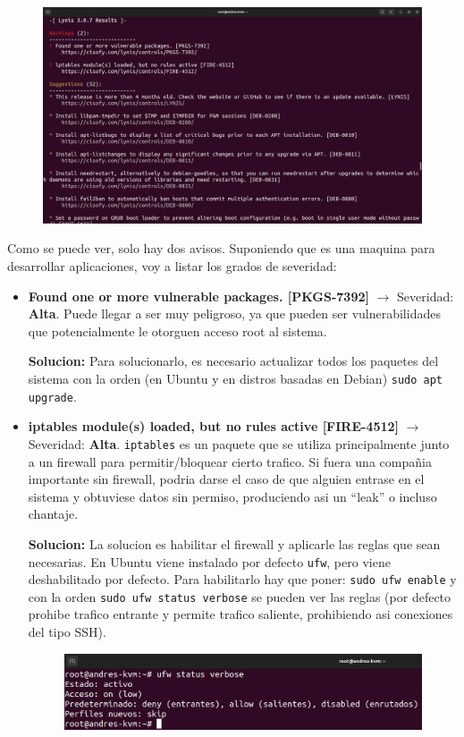 \documentclass{article}
\begin{document}
\begin{figure}[H]
    \includegraphics[width=\textwidth]{imagenes/lyniswarnings1.png}
\end{figure}

Como se puede ver, solo hay dos avisos. Suponiendo que es una maquina para desarrollar aplicaciones, voy a listar los grados de severidad:

\begin{itemize}
    \item \textbf{Found one or more vulnerable packages. [PKGS-7392]} $\rightarrow$ Severidad: \textbf{Alta}. Puede llegar a ser muy peligroso, ya que pueden ser vulnerabilidades que potencialmente le otorguen acceso root al sistema. 
    
    \textbf{Solucion: }Para solucionarlo, es necesario actualizar todos los paquetes del sistema con la orden (en Ubuntu y en distros basadas en Debian) \verb|sudo apt upgrade|.


    \item \textbf{iptables module(s) loaded, but no rules active [FIRE-4512]} $\rightarrow$ Severidad: \textbf{Alta}. \verb|iptables| es un paquete que se utiliza principalmente junto a un firewall para permitir/bloquear cierto trafico. Si fuera una compañia importante sin firewall, podria darse el caso de que alguien entrase en el sistema y obtuviese datos sin permiso, produciendo asi un ``leak'' o incluso chantaje.
    
    \textbf{Solucion: }La solucion es habilitar el firewall y aplicarle las reglas que sean necesarias. En Ubuntu viene instalado por defecto \verb|ufw|, pero viene deshabilitado por defecto. Para habilitarlo hay que poner: \verb|sudo ufw enable| y con la orden \verb|sudo ufw status verbose| se pueden ver las reglas (por defecto prohibe trafico entrante y permite trafico saliente, prohibiendo asi conexiones del tipo SSH).

    \begin{figure}[H]
        \includegraphics[width=\textwidth]{imagenes/ufwstatus.png}
    \end{figure}
\end{itemize}
\end{document}
